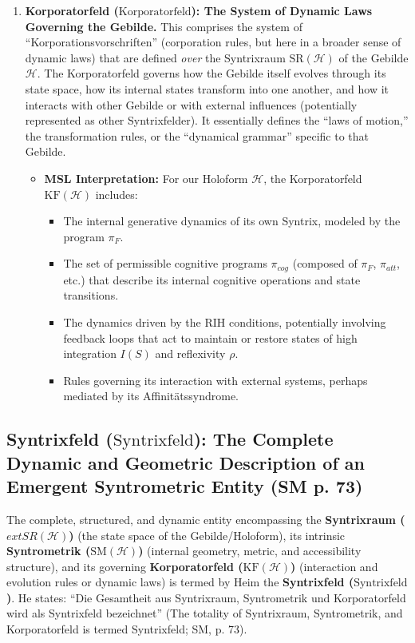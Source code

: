 \documentclass[
    12pt,              %
    a4paper,           %
    headings=normal,   %
    twoside=true,      %
    BCOR=8mm,          %
]{scrbook}
\newcommand{\q}[1]{\enquote{#1}}
\newcommand{\syntrixfeld}{\text{Syntrixfeld}}
\newcommand{\korporatorfeld}{\text{Korporatorfeld}}
\newcommand{\piF}{\pi_F}
\begin{document}
\begin{enumerate}[label=(\alph*)]
    \item  \textbf{Korporatorfeld (\(\korporatorfeld\)): The System of Dynamic Laws Governing the Gebilde.}
        This comprises the system of \q{Korporationsvorschriften} (corporation rules, but here in a broader sense of dynamic laws) that are defined \textit{over} the Syntrixraum \(\text{SR}(\mathcal{H})\) of the Gebilde \(\mathcal{H}\). The Korporatorfeld governs how the Gebilde itself evolves through its state space, how its internal states transform into one another, and how it interacts with other Gebilde or with external influences (potentially represented as other Syntrixfelder). It essentially defines the \q{laws of motion,} the transformation rules, or the \q{dynamical grammar} specific to that Gebilde.
        \begin{itemize}
            \item   \textbf{MSL Interpretation:} For our Holoform \(\mathcal{H}\), the Korporatorfeld \(\text{KF}(\mathcal{H})\) includes:
                \begin{itemize}
                    \item   The internal generative dynamics of its own Syntrix, modeled by the program \(\piF\).
                    \item   The set of permissible cognitive programs \(\pi_{cog}\) (composed of \(\piF\), \(\pi_{att}\), etc.) that describe its internal cognitive operations and state transitions.
                    \item   The dynamics driven by the RIH conditions, potentially involving feedback loops that act to maintain or restore states of high integration \(I(S)\) and reflexivity \(\rho\).
                    \item   Rules governing its interaction with external systems, perhaps mediated by its Affinitätssyndrome.
                \end{itemize}
        \end{itemize}
\end{enumerate}

\subsection{Syntrixfeld (\(\syntrixfeld\)): The Complete Dynamic and Geometric Description of an Emergent Syntrometric Entity (SM p. 73)}
\label{sec:ch4_syntrixfeld_complete_revised_2} 

The complete, structured, and dynamic entity encompassing the \textbf{Syntrixraum (\(	ext{SR}(\mathcal{H})\))} (the state space of the Gebilde/Holoform), its intrinsic \textbf{Syntrometrik (\(\text{SM}(\mathcal{H})\))} (internal geometry, metric, and accessibility structure), and its governing \textbf{Korporatorfeld (\(\text{KF}(\mathcal{H})\))} (interaction and evolution rules or dynamic laws) is termed by Heim the \textbf{Syntrixfeld (\(\syntrixfeld\))}. He states: \q{Die Gesamtheit aus Syntrixraum, Syntrometrik und Korporatorfeld wird als Syntrixfeld bezeichnet} (The totality of Syntrixraum, Syntrometrik, and Korporatorfeld is termed Syntrixfeld; SM, p. 73).
\end{document}
